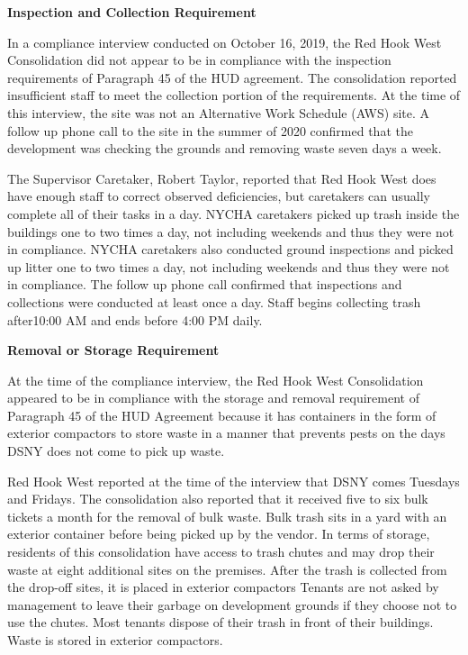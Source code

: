 
\textbf{Inspection and Collection Requirement}

In a compliance interview conducted on October 16, 2019, the Red Hook West Consolidation did not appear to be in compliance with the inspection requirements of Paragraph 45 of the HUD agreement. The consolidation reported insufficient staff to meet the collection portion of the requirements. At the time of this interview, the site was not an Alternative Work Schedule (AWS) site. A follow up phone call to the site in the summer of 2020 confirmed that the development was checking the grounds and removing waste seven days a week.

The Supervisor Caretaker, Robert Taylor, reported that Red Hook West does have enough staff to correct observed deficiencies, but caretakers can usually complete all of their tasks in a day. NYCHA caretakers picked up trash inside the buildings one to two times a day, not including weekends and thus they were not in compliance. NYCHA caretakers also conducted ground inspections and picked up litter one to two times a day, not including weekends and thus they were not in compliance. The follow up phone call confirmed that inspections and collections were conducted at least once a day. Staff begins collecting trash after10:00 AM and ends before 4:00 PM daily. 

\textbf{Removal or Storage Requirement}

At the time of the compliance interview, the Red Hook West Consolidation appeared to be in compliance with the storage and removal requirement of Paragraph 45 of the HUD Agreement because it has containers in the form of exterior compactors to store waste in a manner that prevents pests on the days DSNY does not come to pick up waste. 

Red Hook West reported at the time of the interview that DSNY comes Tuesdays and Fridays. The consolidation also reported that it received five to six bulk tickets a month for the removal of bulk waste. Bulk trash sits in a yard with an exterior container before being picked up by the vendor. In terms of storage, residents of this consolidation have access to trash chutes and may drop their waste at eight additional sites on the premises. After the trash is collected from the drop-off sites, it is placed in exterior compactors Tenants are not asked by management  to leave their garbage on development grounds if they choose not to use the chutes. Most tenants dispose of their trash in front of their buildings. Waste is stored in exterior compactors. 

